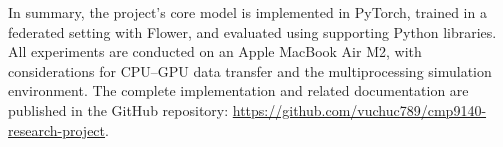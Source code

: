 In summary, the project’s core model is implemented in PyTorch, trained in a federated setting with Flower, and evaluated using supporting Python libraries. All experiments are conducted on an Apple MacBook Air M2, with considerations for CPU–GPU data transfer and the multiprocessing simulation environment. The complete implementation and related documentation are published in the GitHub repository: \url{https://github.com/vuchuc789/cmp9140-research-project}.
